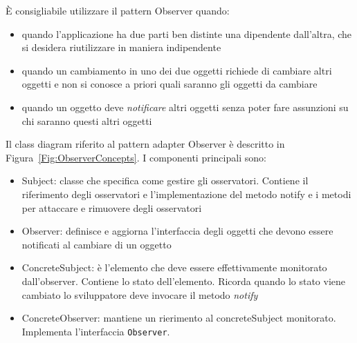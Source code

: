 \documentclass{article}
\begin{document}
\`E consigliabile utilizzare il pattern Observer quando:
\begin{itemize}
\item quando l'applicazione ha due parti ben distinte una dipendente dall'altra, che si desidera riutilizzare in maniera indipendente
\item quando un cambiamento in uno dei due oggetti richiede di cambiare altri oggetti e non si conosce a priori quali saranno gli oggetti da cambiare
\item quando un oggetto deve \emph{notificare} altri oggetti senza poter fare assunzioni su chi saranno questi altri oggetti
\end{itemize}

Il class diagram riferito al pattern adapter Observer \`e descritto in Figura~\ref{Fig:ObserverConcepts}. I componenti principali sono:
\begin{itemize}
\item Subject: classe che specifica come gestire gli osservatori. Contiene il riferimento degli osservatori e l'implementazione del metodo notify e i metodi per attaccare e rimuovere degli osservatori
\item Observer: definisce e aggiorna l'interfaccia degli oggetti che devono essere notificati al cambiare di un oggetto
\item ConcreteSubject: \`e l'elemento che deve essere effettivamente monitorato dall'observer. Contiene lo stato dell'elemento. Ricorda quando lo stato viene cambiato lo sviluppatore deve invocare il metodo \emph{notify}
\item ConcreteObserver: mantiene un rierimento al concreteSubject monitorato. Implementa l'interfaccia \texttt{Observer}.
\end{itemize}
\end{document}
